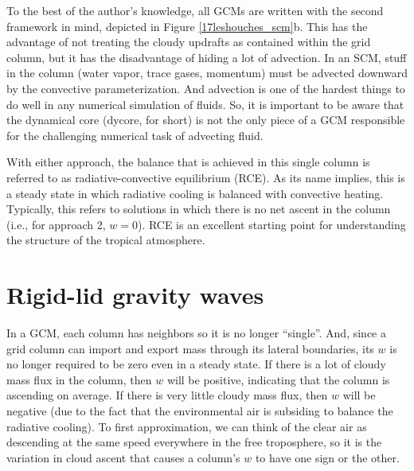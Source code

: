 \documentclass[12pt]{article}
\begin{document}
To the best of the author's knowledge, all GCMs are written with the second framework in mind, depicted in Figure \ref{17leshouches_scm}b.  This has the advantage of not treating the cloudy updrafts as contained within the grid column, but it has the disadvantage of hiding a lot of advection.  In an SCM, stuff in the column (water vapor, trace gases, momentum) must be advected downward by the convective parameterization.  And advection is one of the hardest things to do well in any numerical simulation of fluids.  So, it is important to be aware that the dynamical core (dycore, for short) is not the only piece of a GCM responsible for the challenging numerical task of advecting fluid.


With either approach, the balance that is achieved in this single column is referred to as radiative-convective equilibrium (RCE).  As its name implies, this is a steady state in which radiative cooling is balanced with convective heating.  Typically, this refers to solutions in which there is no net ascent in the column (i.e., for approach 2, $w = 0$).  RCE is an excellent starting point for understanding the structure of the tropical atmosphere.


\section{Rigid-lid gravity waves}


In a GCM, each column has neighbors so it is no longer ``single''.  And, since a grid column can import and export mass through its lateral boundaries, its $w$ is no longer required to be zero even in a steady state.  If there is a lot of cloudy mass flux in the column, then $w$ will be positive, indicating that the column is ascending on average.  If there is very little cloudy mass flux, then $w$ will be negative (due to the fact that the environmental air is subsiding to balance the radiative cooling).  To first approximation, we can think of the clear air as descending at the same speed everywhere in the free troposphere, so it is the variation in cloud ascent that causes a column's $w$ to have one sign or the other.
\end{document}
